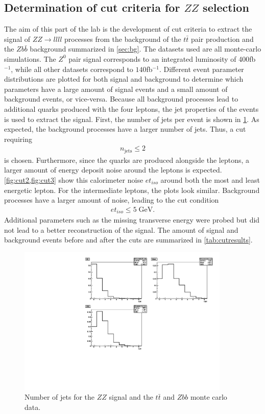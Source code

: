 \documentclass[twoside,        %
               BCOR12mm,       %
               ngerman,english, %
               fleqn,headsepline=false,footsepline=false
              ]{Vorlage/MFPREPORT}
\begin{document}
\subsection{Determination of cut criteria for $ZZ$ selection}
The aim of this part of the lab is the development of cut criteria to extract
the signal of $ZZ\rightarrow llll$ processes from the background of the $t\bar
t$ pair production and the $Z b\bar b$ background summarized in \cref{sec:bg}.
The datasets used are all monte-carlo simulations. The $Z^0$ pair signal
corresponds to an integrated luminosity of 400\;fb$^{-1}$, while all other
datasets correspond to $140$\;fb$^{-1}$. Different event parameter
distributions are plotted for both signal and background to determine which
parameters have a large amount of signal events and a small amount of
background events, or vice-versa. Because all background processes lead
to additional quarks produced with the four leptons, the jet properties of the
events is used to extract the signal. First, the number of jets per event is
shown in \cref{fig:cut1}. As expected, the background processes have a larger
number of jets. Thus, a cut requiring
\begin{align}
n_{\text{jets}}\leq2 
\label{eq:cut1}
\end{align}
is chosen. Furthermore, since the quarks are produced alongside the leptons, a
larger amount of energy deposit noise around the leptons is expected.
\cref{fig:cut2,fig:cut3} show this calorimeter noise $et_{iso}$ around both the most and
least energetic lepton. For the intermediate leptons, the plots look similar.
Background processes have a larger amount of noise, leading to the cut
condition 
\begin{align}
    et_{iso}\leq5\;\text{GeV.}
\label{eq:cut2}
\end{align}
Additional parameters such as the missing transverse energy were probed but did
not lead to a better reconstruction of the signal.
The amount of signal and background events before and after the cuts are
summarized in \ref{tab:cutresults}.
\begin{figure}[h!]
    \begin{center}
        \includegraphics[width=0.9\textwidth]{ZZ/njets_uncut}
    \end{center}
    \caption{Number of jets for the $ZZ$ signal and the $t\bar t$ and $Zbb$
    monte carlo data.}
    \label{fig:cut1}
\end{figure}
\end{document}
